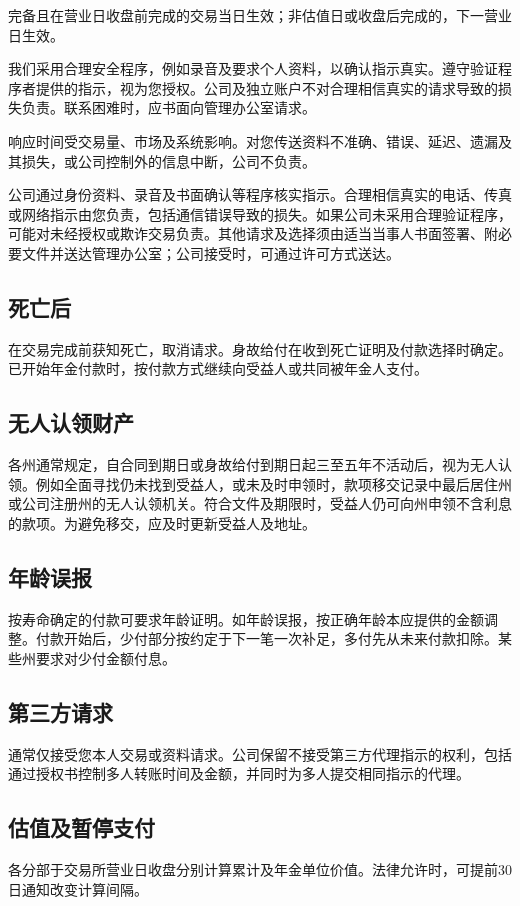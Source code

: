 \documentclass[UTF8,fontset=none,11pt,a4paper]{ctexart}
\begin{document}
完备且在营业日收盘前完成的交易当日生效；非估值日或收盘后完成的，下一营业日生效。


我们采用合理安全程序，例如录音及要求个人资料，以确认指示真实。遵守验证程序者提供的指示，视为您授权。公司及独立账户不对合理相信真实的请求导致的损失负责。联系困难时，应书面向管理办公室请求。


响应时间受交易量、市场及系统影响。对您传送资料不准确、错误、延迟、遗漏及其损失，或公司控制外的信息中断，公司不负责。


公司通过身份资料、录音及书面确认等程序核实指示。合理相信真实的电话、传真或网络指示由您负责，包括通信错误导致的损失。如果公司未采用合理验证程序，可能对未经授权或欺诈交易负责。其他请求及选择须由适当当事人书面签署、附必要文件并送达管理办公室；公司接受时，可通过许可方式送达。


\subsection*{死亡后}
在交易完成前获知死亡，取消请求。身故给付在收到死亡证明及付款选择时确定。已开始年金付款时，按付款方式继续向受益人或共同被年金人支付。


\subsection*{无人认领财产}
各州通常规定，自合同到期日或身故给付到期日起三至五年不活动后，视为无人认领。例如全面寻找仍未找到受益人，或未及时申领时，款项移交记录中最后居住州或公司注册州的无人认领机关。符合文件及期限时，受益人仍可向州申领不含利息的款项。为避免移交，应及时更新受益人及地址。


\subsection*{年龄误报}
按寿命确定的付款可要求年龄证明。如年龄误报，按正确年龄本应提供的金额调整。付款开始后，少付部分按约定于下一笔一次补足，多付先从未来付款扣除。某些州要求对少付金额付息。


\subsection*{第三方请求}
通常仅接受您本人交易或资料请求。公司保留不接受第三方代理指示的权利，包括通过授权书控制多人转账时间及金额，并同时为多人提交相同指示的代理。


\subsection*{估值及暂停支付}
各分部于交易所营业日收盘分别计算累计及年金单位价值。法律允许时，可提前30日通知改变计算间隔。
\end{document}

